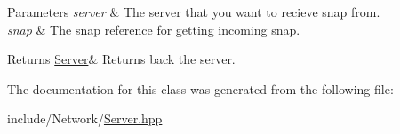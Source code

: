 \begin{DoxyParams}{Parameters}
{\em server} & The server that you want to recieve snap from. \\
\hline
{\em snap} & The snap reference for getting incoming snap. \\
\hline
\end{DoxyParams}
\begin{DoxyReturn}{Returns}
\hyperlink{classcp_1_1_server}{Server}\& Returns back the server. 
\end{DoxyReturn}


The documentation for this class was generated from the following file\+:\begin{DoxyCompactItemize}
\item 
include/\+Network/\hyperlink{_server_8hpp}{Server.\+hpp}\end{DoxyCompactItemize}
